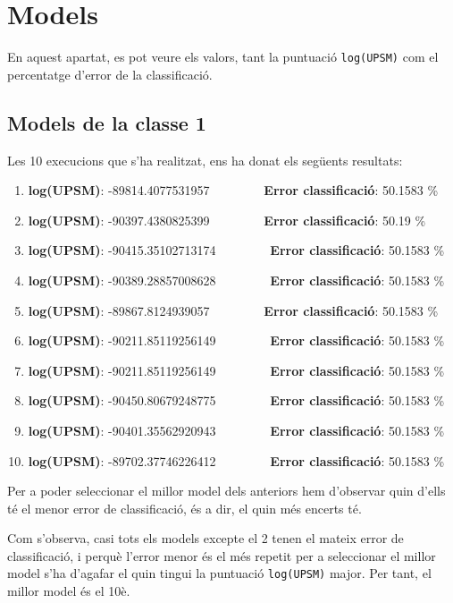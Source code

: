 \documentclass[../informe.tex]{subfiles}
\begin{document}
    \section{Models}
    En aquest apartat, es pot veure els valors, tant la puntuació \texttt{log(UPSM)} com el percentatge d'error de la classificació.
    
    \subsection{Models de la classe 1}
    Les 10 execucions que s'ha realitzat, ens ha donat els següents resultats:
    \begin{enumerate}
        \item \textbf{log(UPSM)}: -89814.4077531957 \ \ \ \ \ \ \ \ \textbf{Error classificació}: 50.1583 \%
        \item \textbf{log(UPSM)}: -90397.4380825399 \ \ \ \ \ \ \ \ \textbf{Error classificació}: 50.19 \%
        \item \textbf{log(UPSM)}: -90415.35102713174 \ \ \ \ \ \ \ \ \textbf{Error classificació}: 50.1583 \%
        \item \textbf{log(UPSM)}: -90389.28857008628 \ \ \ \ \ \ \ \ \textbf{Error classificació}: 50.1583 \%
        \item \textbf{log(UPSM)}: -89867.8124939057 \ \ \ \ \ \ \ \ \textbf{Error classificació}: 50.1583 \%
        \item \textbf{log(UPSM)}: -90211.85119256149 \ \ \ \ \ \ \ \ \textbf{Error classificació}: 50.1583 \%
        \item \textbf{log(UPSM)}: -90211.85119256149 \ \ \ \ \ \ \ \ \textbf{Error classificació}: 50.1583 \%
        \item \textbf{log(UPSM)}: -90450.80679248775 \ \ \ \ \ \ \ \ \textbf{Error classificació}: 50.1583 \%
        \item \textbf{log(UPSM)}: -90401.35562920943 \ \ \ \ \ \ \ \ \textbf{Error classificació}: 50.1583 \%
        \item \textbf{log(UPSM)}: -89702.37746226412 \ \ \ \ \ \ \ \ \textbf{Error classificació}: 50.1583 \%
    \end{enumerate}

    Per a poder seleccionar el millor model dels anteriors hem d'observar quin d'ells té el menor error de classificació, és a dir, el quin més encerts té.

    \medskip
    Com s'observa, casi tots els models excepte el 2 tenen el mateix error de classificació, i perquè l'error menor és el més repetit per a seleccionar el millor model s'ha d'agafar el quin tingui la puntuació \texttt{log(UPSM)} major. Per tant, el millor model és el 10è.
\end{document}

